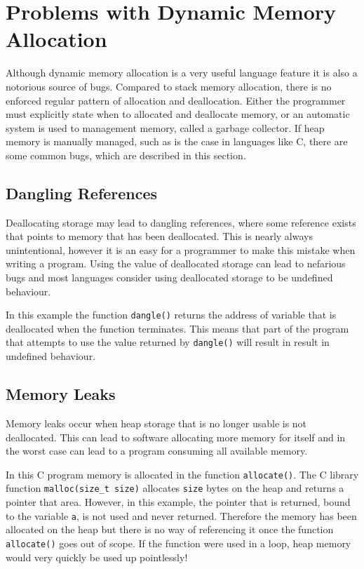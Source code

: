 \section{Problems with Dynamic Memory Allocation}\label{sec:problems}
Although dynamic memory allocation is a very useful language feature it is also
a notorious source of bugs. Compared to stack memory allocation, there is no
enforced regular pattern of allocation and deallocation. Either the programmer
must explicitly state when to allocated and deallocate memory, or an automatic
system is used to management memory, called a garbage collector. If heap memory
is manually managed, such as is the case in languages like C, there are some
common bugs, which are described in this section.

\subsection{Dangling References}\label{sec:dangle}
Deallocating storage may lead to dangling references, where some reference 
exists that points to memory that has been deallocated. This is nearly always
unintentional, however it is an easy for a programmer to make this mistake when
writing a program. Using the value of deallocated storage can lead to nefarious
bugs and most languages consider using deallocated storage to
be undefined behaviour.



In this example the function \lstinline{dangle()} returns the address of variable
that is deallocated when the function terminates. This means that part of the
program that attempts to use the value returned by \lstinline{dangle()} will
result in result in undefined behaviour.

\subsection{Memory Leaks}\label{sec:leak}
Memory leaks occur when heap storage that is no longer usable is not
deallocated. This can lead to software allocating more memory for itself and in
the worst case can lead to a program consuming all available memory.



In this C program memory is allocated in the function \lstinline{allocate()}.
The C library function \lstinline{malloc(size_t size)} allocates \lstinline{size}
bytes on the heap and returns a pointer that area. However, in this example,
the pointer that is returned, bound to the variable \lstinline{a}, is not used
and never returned. Therefore the memory has been allocated on the heap but
there is no way of referencing it once the function \lstinline{allocate()} goes
out of scope. If the function were used in a loop, heap memory would very quickly
be used up pointlessly! 

